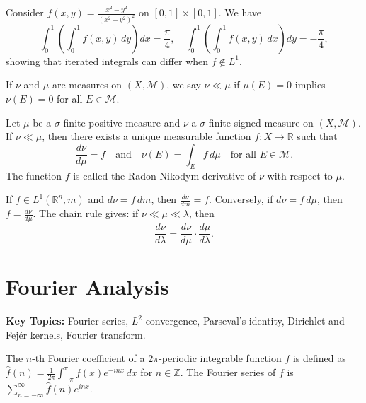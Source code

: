 \begin{example}
Consider $f(x,y) = \frac{x^2 - y^2}{(x^2 + y^2)^2}$ on $[0,1] \times [0,1]$. We have
\[
\int_0^1 \left( \int_0^1 f(x,y) \, dy \right) dx = \frac{\pi}{4}, \quad
\int_0^1 \left( \int_0^1 f(x,y) \, dx \right) dy = -\frac{\pi}{4},
\]
showing that iterated integrals can differ when $f \notin L^1$.
\end{example}

\begin{definition}
If $\nu$ and $\mu$ are measures on $(X, \mathcal{M})$, we say $\nu \ll \mu$ if $\mu(E) = 0$ implies $\nu(E) = 0$ for all $E \in \mathcal{M}$.
\end{definition}

\begin{theorem}
Let $\mu$ be a $\sigma$-finite positive measure and $\nu$ a $\sigma$-finite signed measure on $(X, \mathcal{M})$. If $\nu \ll \mu$, then there exists a unique measurable function $f: X \to \mathbb{R}$ such that
\[
\frac{d\nu}{d\mu} = f \quad \text{and} \quad \nu(E) = \int_E f \, d\mu \quad \text{for all } E \in \mathcal{M}.
\]
The function $f$ is called the Radon-Nikodym derivative of $\nu$ with respect to $\mu$.
\end{theorem}

\begin{example}
If $f \in L^1(\mathbb{R}^n, m)$ and $d\nu = f \, dm$, then $\frac{d\nu}{dm} = f$. Conversely, if $d\nu = f \, d\mu$, then $f = \frac{d\nu}{d\mu}$. The chain rule gives: if $\nu \ll \mu \ll \lambda$, then
\[
\frac{d\nu}{d\lambda} = \frac{d\nu}{d\mu} \cdot \frac{d\mu}{d\lambda}.
\]
\end{example}

\section{Fourier Analysis}

\textbf{Key Topics:} Fourier series, $L^2$ convergence, Parseval's identity, Dirichlet and Fej\'er kernels, Fourier transform.

\begin{definition}
The $n$-th Fourier coefficient of a $2\pi$-periodic integrable function $f$ is defined as $\hat{f}(n) = \frac{1}{2\pi} \int_{-\pi}^{\pi} f(x) e^{-inx} \, dx$ for $n \in \mathbb{Z}$. The Fourier series of $f$ is $\sum_{n=-\infty}^{\infty} \hat{f}(n) e^{inx}$.
\end{definition}

